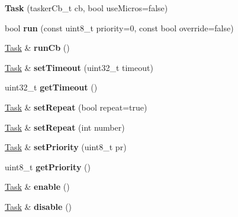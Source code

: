 \begin{DoxyCompactItemize}
\item 
\mbox{\label{class_task_abf4c9149babce0960cf1e628de499f9d}} 
{\bfseries Task} (tasker\+Cb\+\_\+t cb, bool use\+Micros=false)
\item 
\mbox{\label{class_task_ab69f69089f91b6b7c696564a6796e0ca}} 
bool {\bfseries run} (const uint8\+\_\+t priority=0, const bool override=false)
\item 
\mbox{\label{class_task_a1fc4c9c46651e9c4fc0240b5619ea850}} 
\hyperlink{class_task}{Task} \& {\bfseries run\+Cb} ()
\item 
\mbox{\label{class_task_ae65879becb23f5381225ee0c8959b739}} 
\hyperlink{class_task}{Task} \& {\bfseries set\+Timeout} (uint32\+\_\+t timeout)
\item 
\mbox{\label{class_task_a602c3d55c3ce1adf70c77ca34dac5eba}} 
uint32\+\_\+t {\bfseries get\+Timeout} ()
\item 
\mbox{\label{class_task_af0cdd7eb17b54decbca227cc2db86aaa}} 
\hyperlink{class_task}{Task} \& {\bfseries set\+Repeat} (bool repeat=true)
\item 
\mbox{\label{class_task_a2eba537a294f1ea2e9d0d375ad980993}} 
\hyperlink{class_task}{Task} \& {\bfseries set\+Repeat} (int number)
\item 
\mbox{\label{class_task_aed0f55a2f6129e1ee9ec6bf1f49339ba}} 
\hyperlink{class_task}{Task} \& {\bfseries set\+Priority} (uint8\+\_\+t pr)
\item 
\mbox{\label{class_task_affea110babfe474fc6ccdb88e7b8122e}} 
uint8\+\_\+t {\bfseries get\+Priority} ()
\item 
\mbox{\label{class_task_a7f9a1b3b8b2f16bba8fa05831dff6776}} 
\hyperlink{class_task}{Task} \& {\bfseries enable} ()
\item 
\mbox{\label{class_task_afe347b4ccfcaf48c333f87cd4e832ecf}} 
\hyperlink{class_task}{Task} \& {\bfseries disable} ()
\item 

\end{DoxyCompactItemize}
